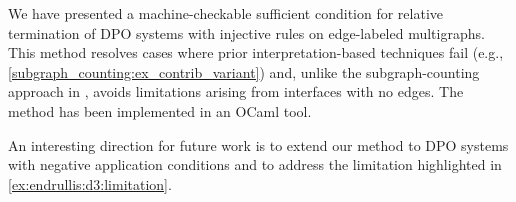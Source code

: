 We have presented a machine-checkable sufficient condition for relative termination of DPO systems with injective rules on edge-labeled multigraphs.  
This method resolves cases where prior interpretation-based techniques \cite{zantema2014termination,bruggink2014termination,bruggink2015proving,endrullis2024generalized_arxiv_v2,
overbeek2024termination_lmcs} fail (e.g., \autoref{subgraph_counting:ex_contrib_variant}) and, unlike the subgraph-counting approach in \cite{overbeek2024termination_lmcs}, avoids limitations arising from interfaces with no edges.
The method has been implemented in an OCaml tool. 

An interesting direction for future work is to extend our method to DPO systems with negative application conditions and to address the limitation highlighted in \autoref{ex:endrullis:d3:limitation}.